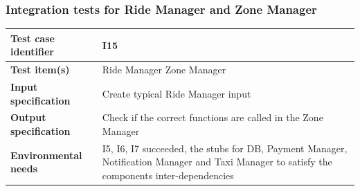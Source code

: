 \documentclass[a4paper,11pt]{report} %
\begin{document}
		\subsubsection{Integration tests for Ride Manager and Zone Manager} \label{sec:3.1.12}
			\begin{minipage}{\linewidth}
			\end{minipage}		
		\begin{center}
			\renewcommand{\arraystretch}{1.2}
			\setlength{\tabcolsep}{24pt}
			\begin{tabular}{ l  p{9cm}}\hline
				\textbf{Test case identifier} & I15\\\hline
				\textbf{Test item(s)} & Ride Manager \textrightarrow Zone Manager\\\hline
				\textbf{Input specification} & Create typical Ride Manager input \\\hline
				\textbf{Output specification} & Check if the correct functions are called in the Zone Manager\\\hline
				\textbf{Environmental needs} & I5, I6, I7 succeeded, the stubs for DB, Payment Manager, Notification Manager and Taxi Manager to satisfy the components inter-dependencies\\\hline
			\end{tabular}
		\end{center}	
		
		\bigskip  
\end{document}
